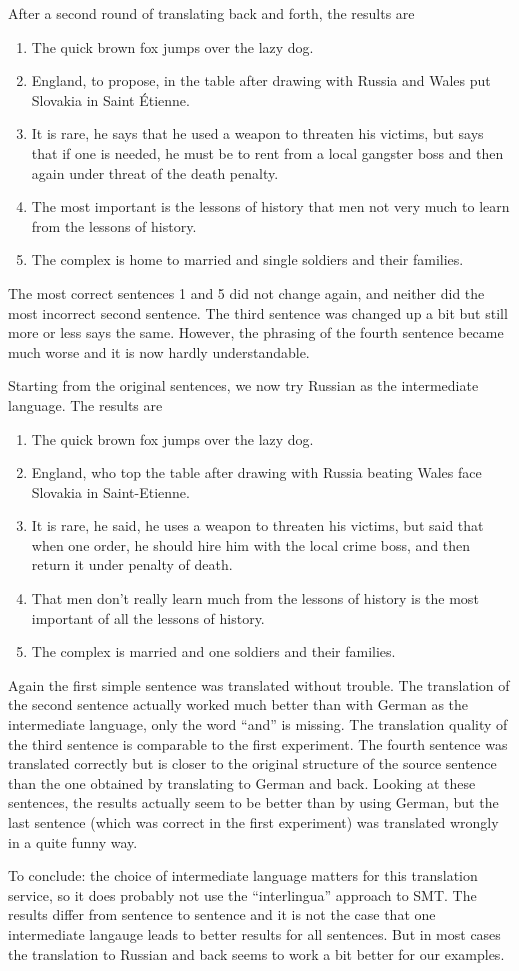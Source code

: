 \documentclass[%
   11pt,              %
   ngerman,           %
   a4paper,           %
   DIV11,             %
]{scrartcl}%
\begin{document}
After a second round of translating back and forth, the results are
\begin{enumerate}
	\item The quick brown fox jumps over the lazy dog. 
	\item England, to propose, in the table after drawing with Russia and Wales put Slovakia in Saint Étienne.
	\item It is rare, he says that he used a weapon to threaten his victims, but says that if one is needed, he must be to rent from a local gangster boss and then again under threat of the death penalty.
	\item The most important is the lessons of history that men not very much to learn from the lessons of history.
	\item The complex is home to married and single soldiers and their families.
\end{enumerate}
The most correct sentences 1 and 5 did not change again, and neither did the most incorrect second sentence. The third sentence was changed up a bit but still more or less says the same. However, the phrasing of the fourth sentence became much worse and it is now hardly understandable. \par
Starting from the original sentences, we now try Russian as the intermediate language. The results are
\begin{enumerate}
	\item The quick brown fox jumps over the lazy dog. 
	\item England, who top the table after drawing with Russia beating Wales face Slovakia in Saint-Etienne. 
	\item It is rare, he said, he uses a weapon to threaten his victims, but said that when one order, he should hire him with the local crime boss, and then return it under penalty of death. 
	\item That men don't really learn much from the lessons of history is the most important of all the lessons of history. 
	\item The complex is married and one soldiers and their families.
\end{enumerate}
Again the first simple sentence was translated without trouble. The translation of the second sentence actually worked much better than with German as the intermediate language, only the word ``and'' is missing. The translation quality of the third sentence is comparable to the first experiment. The fourth sentence was translated correctly but is closer to the original structure of the source sentence than the one obtained by translating to German and back. Looking at these sentences, the results actually seem to be better than by using German, but the last sentence (which was correct in the first experiment) was translated wrongly in a quite funny way. \par
 To conclude: the choice of intermediate language matters for this translation service, so it does probably not use the ``interlingua'' approach to SMT. The results differ from sentence to sentence and it is not the case that one intermediate langauge leads to better results for all sentences. But in most cases the translation to Russian and back seems to work a bit better for our examples.
\end{document}
